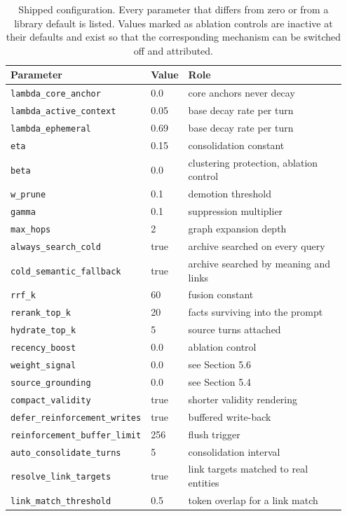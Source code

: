 \documentclass[10pt,a4paper,twocolumn]{article}
\begin{document}
\begin{table}[tb]
\centering
\caption{Shipped configuration. Every parameter that differs from zero or from a library default is listed. Values marked as ablation controls are inactive at their defaults and exist so that the corresponding mechanism can be switched off and attributed.}\label{table:config}
\small
\begin{tabular}{p{0.369\linewidth}p{0.066\linewidth}p{0.515\linewidth}}
\toprule
Parameter & Value & Role \\
\midrule
\texttt{lambda\_core\_anchor} & 0.0 & core anchors never decay \\
\texttt{lambda\_active\_context} & 0.05 & base decay rate per turn \\
\texttt{lambda\_ephemeral} & 0.69 & base decay rate per turn \\
\texttt{eta} & 0.15 & consolidation constant \\
\texttt{beta} & 0.0 & clustering protection, ablation control \\
\texttt{w\_prune} & 0.1 & demotion threshold \\
\texttt{gamma} & 0.1 & suppression multiplier \\
\texttt{max\_hops} & 2 & graph expansion depth \\
\texttt{always\_search\_cold} & true & archive searched on every query \\
\texttt{cold\_semantic\_fallback} & true & archive searched by meaning and links \\
\texttt{rrf\_k} & 60 & fusion constant \\
\texttt{rerank\_top\_k} & 20 & facts surviving into the prompt \\
\texttt{hydrate\_top\_k} & 5 & source turns attached \\
\texttt{recency\_boost} & 0.0 & ablation control \\
\texttt{weight\_signal} & 0.0 & see Section 5.6 \\
\texttt{source\_grounding} & 0.0 & see Section 5.4 \\
\texttt{compact\_validity} & true & shorter validity rendering \\
\texttt{defer\_reinforcement\_writes} & true & buffered write-back \\
\texttt{reinforcement\_buffer\_limit} & 256 & flush trigger \\
\texttt{auto\_consolidate\_turns} & 5 & consolidation interval \\
\texttt{resolve\_link\_targets} & true & link targets matched to real entities \\
\texttt{link\_match\_threshold} & 0.5 & token overlap for a link match \\
\bottomrule
\end{tabular}
\end{table}
\end{document}
